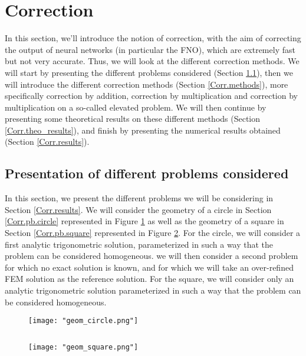 \section{Correction} \label{Corr}
\graphicspath{{images/corr}}

In this section, we'll introduce the notion of correction, with the aim of correcting the output of neural networks (in particular the FNO), which are extremely fast but not very accurate. Thus, we will look at the different correction methods. We will start by presenting the different problems considered (Section \ref{Corr.problems}), then we will introduce the different correction methods (Section \ref{Corr.methods}), more specifically correction by addition, correction by multiplication and correction by multiplication on a so-called elevated problem. We will then continue by presenting some theoretical results on these different methods (Section \ref{Corr.theo_results}), and finish by presenting the numerical results obtained (Section \ref{Corr.results}).

\subsection{Presentation of different problems considered} \label{Corr.problems}

In this section, we present the different problems we will be considering in Section \ref{Corr.results}. We will consider the geometry of a circle in Section \ref{Corr.pb.circle} represented in Figure \ref{geom_circle} as well as the geometry of a square in Section \ref{Corr.pb.square} represented in Figure \ref{geom_square}. For the circle, we will consider a first analytic trigonometric solution, parameterized in such a way that the problem can be considered homogeneous. we will then consider a second problem for which no exact solution is known, and for which we will take an over-refined FEM solution as the reference solution. For the square, we will consider only an analytic trigonometric solution parameterized in such a way that the problem can be considered homogeneous.

\begin{minipage}{0.48\linewidth}
	\begin{figure}[H]
		\centering
		\texttt{[image: "geom\_circle.png"]}
		\label{geom_circle}
	\end{figure} 
\end{minipage} $\qquad$
\begin{minipage}{0.48\linewidth}
	\begin{figure}[H]
		\centering
		\texttt{[image: "geom\_square.png"]}
		\label{geom_square}
	\end{figure} 
\end{minipage}

